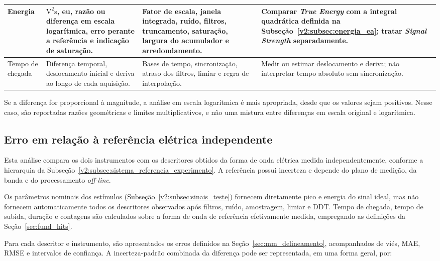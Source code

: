 \begin{longtable}{|
		>{\raggedright\arraybackslash}p{2.5cm}|
		>{\raggedright\arraybackslash}p{4.0cm}|
		>{\raggedright\arraybackslash}p{4.1cm}|
		>{\raggedright\arraybackslash}p{3.6cm}|}
	\hline
	Energia & \(\mathrm{V^2s}\), eu, razão ou diferença em escala logarítmica, erro perante a referência e indicação de saturação. & Fator de escala, janela integrada, ruído, filtros, truncamento, saturação, largura do acumulador e arredondamento. & Comparar \textit{True Energy} com a integral quadrática definida na Subseção~\ref{v2:subsec:energia_ea}; tratar \textit{Signal Strength} separadamente. \\
	\hline
	Tempo de chegada & Diferença temporal, deslocamento inicial e deriva ao longo de cada aquisição. & Bases de tempo, sincronização, atraso dos filtros, limiar e regra de interpolação. & Medir ou estimar deslocamento e deriva; não interpretar tempo absoluto sem sincronização. \\
\end{longtable}
\endgroup

Se a diferença for proporcional à magnitude, a análise em escala logarítmica é mais apropriada, desde que os valores sejam positivos. Nesse caso, são reportadas razões geométricas e limites multiplicativos, e não uma mistura entre diferenças em escala original e logarítmica.

\subsection{Erro em relação à referência elétrica independente}
\label{v2:subsec:exatidao_referencia_resultados}

Esta análise compara os dois instrumentos com os descritores obtidos da forma de onda elétrica medida independentemente, conforme a hierarquia da Subseção~\ref{v2:subsec:sistema_referencia_experimento}. A referência possui incerteza e depende do plano de medição, da banda e do processamento \textit{off-line}.

Os parâmetros nominais dos estímulos (Subseção~\ref{v2:subsec:sinais_teste}) fornecem diretamente pico e energia do sinal ideal, mas não fornecem automaticamente todos os descritores observados após filtros, ruído, amostragem, limiar e DDT. Tempo de chegada, tempo de subida, duração e contagens são calculados sobre a forma de onda de referência efetivamente medida, empregando as definições da Seção~\ref{sec:fund_hits}.

Para cada descritor e instrumento, são apresentados os erros definidos na Seção~\ref{sec:mm_delineamento}, acompanhados de viés, MAE, RMSE e intervalos de confiança. A incerteza-padrão combinada da diferença pode ser representada, em uma forma geral, por:

